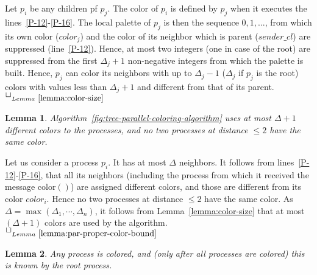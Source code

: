 \documentclass[11pt,english]{article}
\newtheorem{lemma}{Lemma}
\newcommand{\toto}{xxx}
\newenvironment{proofL}{\noindent{\bf
Proof }} {\hspace*{\fill}$\Box_{Lemma~\ref{\toto}}$\par\vspace{3mm}}
\begin{document}
\begin{proofL}
  Let $p_i$ be any children pf $p_j$.  The color of $p_i$ is defined
  by $p_j$ when it executes the lines~\ref{P-12}-\ref{P-16}.  The
  local palette of $p_j$ is then the sequence $0,1,...$, from which
  its own color ($color_j$) and the color of its neighbor which is
  parent ($sender\_cl$) are suppressed (line~\ref{P-12}).  Hence, at
  most two integers (one in case of the root) are suppressed from the
  first $\Delta_j+1$ non-negative integers from which the palette is
  built.  Hence, $p_j$ can color its neighbors with up to $\Delta_j-1$
  ($\Delta_j$ if $p_j$ is the root) colors with values less than
  $\Delta_j+1$ and different from that of its parent.
  \renewcommand{\toto}{lemma:color-size}
\end{proofL}

\begin{lemma}
\label{lemma:par-proper-color-bound}
Algorithm~{\em\ref{fig:tree-parallel-coloring-algorithm}} 
uses at most $\Delta+1$ different colors to the processes, and no
two processes at distance $\leq 2$ have the same color.
\end{lemma}

\begin{proofL}
Let us consider a process $p_i$. It has at most $\Delta$ neighbors. 
It follows from lines~\ref{P-12}-\ref{P-16}, that all its  
neighbors (including the process from which it received the message 
{\sc color}$()$) are  assigned different colors, and those are 
different from its color $color_i$. Hence no two processes at distance 
$\leq 2$ have the same color. As $\Delta=\max(\Delta_1,\cdots,\Delta_n)$, 
it follows from  Lemma~\ref{lemma:color-size} that at most 
$(\Delta+1)$ colors are used by the algorithm. 
\renewcommand{\toto}{lemma:par-proper-color-bound}
\end{proofL}




\begin{lemma}
\label{lemma:par-termination}
Any process is colored, and (only after all processes are colored) 
this is known by the root process. 
\end{lemma}
\end{document}
